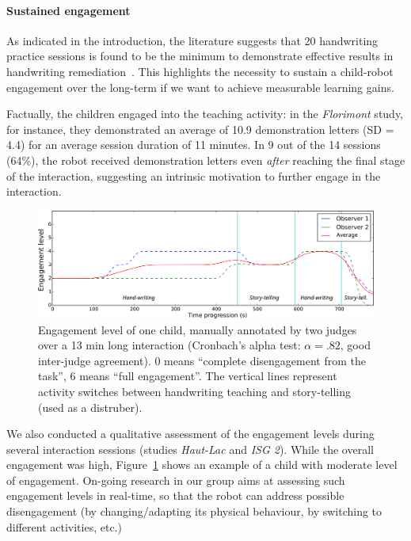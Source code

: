 \documentclass{article}
\begin{document}
\paragraph{Sustained engagement}

As indicated in the introduction, the literature suggests that 20 handwriting
practice sessions is found to be the minimum to demonstrate effective results in
handwriting remediation~\cite{Hoy2011}. This highlights the necessity to sustain
a child-robot engagement over the long-term if we want to achieve measurable learning gains.

Factually, the children engaged into the teaching activity: in the
\textit{Florimont} study, for instance, they demonstrated an average of
10.9 demonstration letters (SD = 4.4) for an average session duration of 11 minutes.
In 9 out of the 14 sessions (64\%), the robot
received demonstration letters even \emph{after} reaching the final stage of the
interaction, suggesting an intrinsic motivation to further engage in the
interaction.

\begin{figure}[ht!]
    \centering
    \includegraphics[width=0.9\linewidth]{engagement}
    \caption{\small Engagement level of one child, manually annotated by two judges
        over a 13 min long interaction (Cronbach’s alpha test: $\alpha = .82$,
        good inter-judge agreement). 0 means ``complete disengagement from the
        task'', 6 means ``full engagement''. The vertical lines represent activity
    switches between handwriting teaching and story-telling (used as a
    distruber).}
    \label{engagement_level}
\end{figure}

We also conducted a qualitative assessment of the engagement levels during
several interaction sessions (studies \textit{Haut-Lac} and \textit{ISG 2}).
While the overall engagement was high, Figure~\ref{engagement_level} shows an
example of a child with moderate level of engagement. On-going research in our
group aims at assessing such engagement levels in real-time, so that the robot
can address possible disengagement (by changing/adapting its physical behaviour,
by switching to different activities, etc.)
\end{document}
